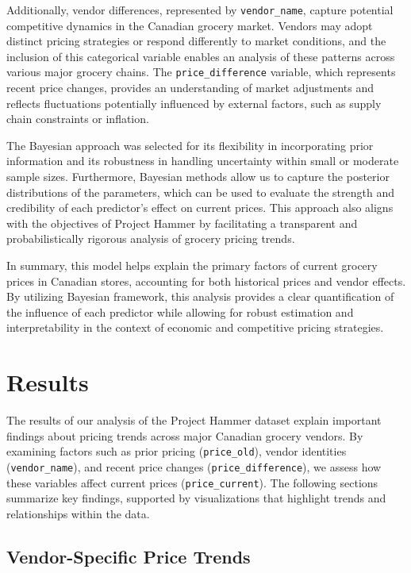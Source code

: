 \documentclass[
  letterpaper,
  DIV=11,
  numbers=noendperiod]{scrartcl}
\begin{document}
Additionally, vendor differences, represented by \texttt{vendor\_name},
capture potential competitive dynamics in the Canadian grocery market.
Vendors may adopt distinct pricing strategies or respond differently to
market conditions, and the inclusion of this categorical variable
enables an analysis of these patterns across various major grocery
chains. The \texttt{price\_difference} variable, which represents recent
price changes, provides an understanding of market adjustments and
reflects fluctuations potentially influenced by external factors, such
as supply chain constraints or inflation.

The Bayesian approach was selected for its flexibility in incorporating
prior information and its robustness in handling uncertainty within
small or moderate sample sizes. Furthermore, Bayesian methods allow us
to capture the posterior distributions of the parameters, which can be
used to evaluate the strength and credibility of each predictor's effect
on current prices. This approach also aligns with the objectives of
Project Hammer by facilitating a transparent and probabilistically
rigorous analysis of grocery pricing trends.

In summary, this model helps explain the primary factors of current
grocery prices in Canadian stores, accounting for both historical prices
and vendor effects. By utilizing Bayesian framework, this analysis
provides a clear quantification of the influence of each predictor while
allowing for robust estimation and interpretability in the context of
economic and competitive pricing strategies.

\section{Results}\label{results}

The results of our analysis of the Project Hammer dataset explain
important findings about pricing trends across major Canadian grocery
vendors. By examining factors such as prior pricing
(\texttt{price\_old}), vendor identities (\texttt{vendor\_name}), and
recent price changes (\texttt{price\_difference}), we assess how these
variables affect current prices (\texttt{price\_current}). The following
sections summarize key findings, supported by visualizations that
highlight trends and relationships within the data.

\subsection{Vendor-Specific Price
Trends}\label{vendor-specific-price-trends}
\end{document}
